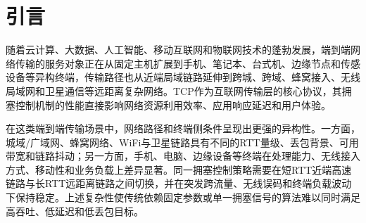\documentclass[10pt,twocolumn]{article}
\begin{document}
\begin{abstract}
在ns-3.40离散事件仿真平台上，本文以哑铃拓扑、3条并发长流评估Swift，实验矩阵覆盖36个场景（近端高速、共享汇聚、无线局域网、蜂窝接入、城域/跨域广域网与LEO/GEO卫星链路，瓶颈10 Mbps$\sim$100 Gbps、基线RTT 4 $\mu$s$\sim$640 ms），并在瓶颈上以\textbf{平均负载为瓶颈速率32\%、峰值速率64\%（50\%占空比）}的UDP突发流构成严格A/B对照，两种设置下共运行288次仿真。瓶颈队列统一采用启用ECN标记的RED（$MinTh=0.3Q$、$MaxTh=0.9Q$），并对四种协议对称开启ECN协商。全部指标仅按前向数据流定义（\texttt{logs/summary/kpi\_forward.csv}），288条记录全部通过物理相容性审计，无需排除任何场景。结果表明：纯TCP设置下Swift在\textbf{全部36个场景}取得最高聚合吞吐量，相对最强基线的增益为$+2.1\%\sim+5.8\%（均值+4.1\%）$，且该增益在微秒级近端链路、无线/蜂窝接入与远距离链路三类路径上均匀分布；平均单向时延相对NewReno/CUBIC均值低约2.3\%（36个场景中24个更低），与BBR基本相当；四协议丢包率全部不超过0.026\%，Jain公平性指数Swift均值0.9989为四者最高。UDP突发下Swift吞吐量保持率均值68.6\%（最差62.4\%），与基线持平，但\textbf{绝对吞吐量仍在全部36个场景领先}（相对最强基线$+2.2\%\sim+5.9\%$）；GEO卫星场景纯TCP吞吐量8.78 Mbps（相对NewReno $+7.5\%$）、突发下5.65 Mbps（相对NewReno $+10.1\%$）。本文同时如实披露混合结果：在\texttt{congested\_heavy}等深缓冲低速率场景及\texttt{wifi\_legacy}等链路上，Swift以约0.1$\sim$0.4 ms（相对值最高约10\%）的排队时延换取吞吐领先，且Swift的丢包率并不系统性低于基线（差值为0.001$\sim$0.003个百分点量级）。全部定量结果可在给定随机种子下逐项复现。

\vspace{0.3em}
\noindent\textbf{关键词：}拥塞控制；启发式自适应；多信号融合；显式拥塞通知；自适应参数调优；远距离传输；异构终端
\end{abstract}


\section{引言}

随着云计算、大数据、人工智能、移动互联网和物联网技术的蓬勃发展，端到端网络传输的服务对象正在从固定主机扩展到手机、笔记本、台式机、边缘节点和传感设备等异构终端，传输路径也从近端局域链路延伸到跨城、跨域、蜂窝接入、无线局域网和卫星通信等远距离复杂网络。TCP作为互联网传输层的核心协议，其拥塞控制机制的性能直接影响网络资源利用效率、应用响应延迟和用户体验。

在这类端到端传输场景中，网络路径和终端侧条件呈现出更强的异构性。一方面，城域/广域网、蜂窝网络、WiFi与卫星链路具有不同的RTT量级、丢包背景、可用带宽和链路抖动；另一方面，手机、电脑、边缘设备等终端在处理能力、无线接入方式、移动性和业务负载上差异显著。同一拥塞控制策略需要在短RTT近端高速链路与长RTT远距离链路之间切换，并在突发跨流量、无线误码和终端负载波动下保持稳定。上述复杂性使传统依赖固定参数或单一拥塞信号的算法难以同时满足高吞吐、低延迟和低丢包目标。
\end{document}
